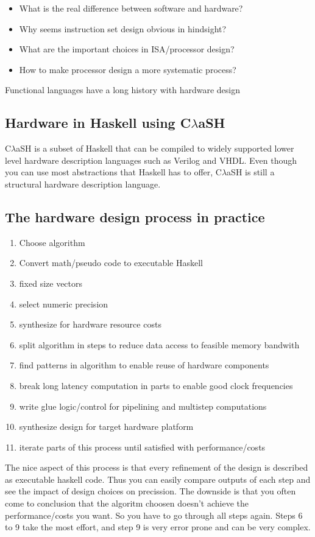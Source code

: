 \documentclass[preprint]{sigplanconf}
\def\clash{C$\lambda$aSH\xspace}
\begin{document}
\begin{itemize}
 \item What is the real difference between software and hardware?
 \item Why seems instruction set design obvious in hindsight?
 \item What are the important choices in ISA/processor design?
 \item How to make processor design a more systematic process?
\end{itemize}

Functional languages have a long history with hardware design \cite{Sheeran2005}

\subsection{Hardware in Haskell using \clash}
\clash \cite{Baaij} is a subset of Haskell that can be compiled to widely supported lower level hardware description languages such as Verilog and VHDL.
Even though you can use most abstractions that Haskell has to offer, \clash is still a structural hardware description language.

\subsection{The hardware design process in practice}
\begin{enumerate}
 \item Choose algorithm
 \item Convert math/pseudo code to executable Haskell
 \item fixed size vectors
 \item select numeric precision
 \item synthesize for hardware resource costs
 \item split algorithm in steps to reduce data access to feasible memory bandwith
 \item find patterns in algorithm to enable reuse of hardware components
 \item break long latency computation in parts to enable good clock frequencies
 \item write glue logic/control for pipelining and multistep computations
 \item synthesize design for target hardware platform
 \item iterate parts of this process until satisfied with performance/costs
\end{enumerate}
The nice aspect of this process is that every refinement of the design is described as executable haskell code.
Thus you can easily compare outputs of each step and see the impact of design choices on precission.
The downside is that you often come to conclusion that the algoritm choosen doesn't achieve the performance/costs you want. So you have to go through all steps again.
Steps 6 to 9 take the most effort, and step 9 is very error prone and can be very complex.
\end{document}
